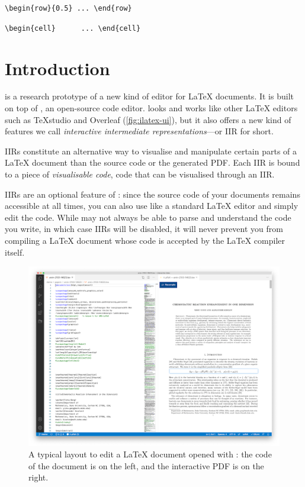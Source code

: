 \documentclass[11pt, a4paper]{article}
\begin{document}
\hfill
\lstinline[style=custom-latex]|\begin{row}{0.5} ... \end{row}|

\hfill
\lstinline[style=custom-latex]|\begin{cell}{0.5} ... \end{cell}|



\newpage
\section{Introduction}
\iLaTeX{} is a research prototype of a new kind of editor for \LaTeX{} documents.
It is built on top of \vsc, an open-source code editor.
\iLaTeX{} looks and works like other \LaTeX{} editors such as TeXstudio and Overleaf (\autoref{fig:ilatex-ui}), but it also offers a new kind of features we call \emph{interactive intermediate representations}---or IIR for short.

IIRs constitute an alternative way to visualise and manipulate certain parts of a \LaTeX{} document than the source code or the generated PDF.
Each IIR is bound to a piece of \emph{visualisable code}, \ie code that can be visualised through an IIR.

IIRs are an optional feature of \iLaTeX{}: since the source code of your documents remains accessible at all times, you can also use \iLaTeX{} like a standard \LaTeX{} editor and simply edit the code.
While \iLaTeX{} may not always be able to parse and understand the code you write, in which case IIRs will be disabled, it will never prevent you from compiling a \LaTeX{} document whose code is accepted by the \LaTeX{} compiler itself.

\begin{figure}[h]
    \centering
    \includegraphics[width = \textwidth]{img/ilatex-editor-ui.png}
    \caption{A typical layout to edit a \LaTeX{} document opened with \iLaTeX{}: the code of the document is on the left, and the interactive PDF is on the right.}
    \label{fig:ilatex-ui}
\end{figure}
\end{document}
